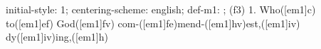 initial-style: 1;
centering-scheme: english;
def-m1: \grealign;
(f3) 1. Who([em1]c) to([em1]ef) God([em1]fv) com-([em1]fe)mend-([em1]hv)est,([em1]iv) dy([em1]iv)ing,([em1]h)